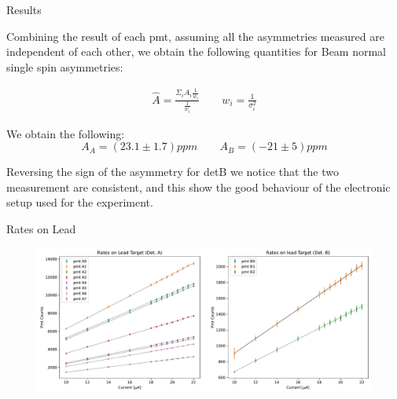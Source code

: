 \documentclass[8pt,a4paper]{beamer}
\begin{document}
\begin{frame}{Results}
 
Combining the result of each pmt, assuming all the asymmetries measured are independent of each other, we obtain the following quantities for Beam normal single spin asymmetries:

\begin{gather*}
\hat{A} =  \frac{\Sigma_{i} A_{i} \frac{1}{w_{i}}}{\frac{1}{w_{i}}} \qquad w_{i} = \frac{1}{\sigma^{2}_{i}}
\end{gather*}

We obtain the following:
\begin{equation}
A_{A} = (23.1 \pm 1.7) ppm  \qquad A_{B} = (-21  \pm 5)ppm
\end{equation}

Reversing the sign of the asymmetry for detB we notice that the two measurement are consistent, and this show the good behaviour of the electronic setup used for the experiment. 

\end{frame}

\begin{frame}{Rates on Lead}
\begin{figure}[hbtp]
\centering
\includegraphics[width = \textwidth]{figures/LeadRates.pdf}
\end{figure}

\end{frame}
\end{document}
